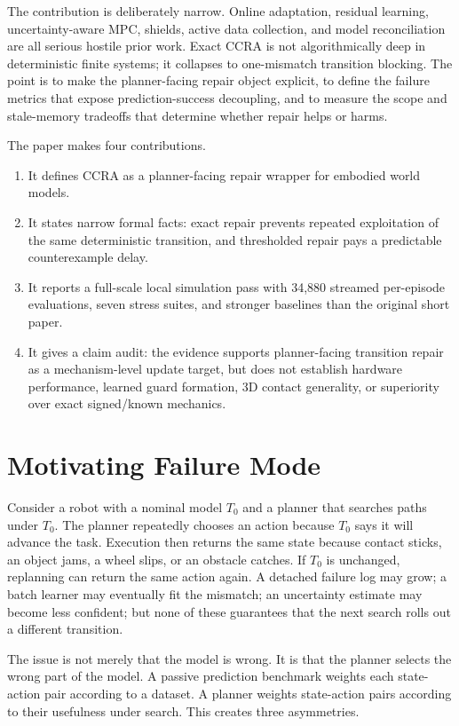 \documentclass{article}
\begin{document}
The contribution is deliberately narrow. Online adaptation, residual learning, uncertainty-aware MPC, shields, active data collection, and model reconciliation are all serious hostile prior work. Exact CCRA is not algorithmically deep in deterministic finite systems; it collapses to one-mismatch transition blocking. The point is to make the planner-facing repair object explicit, to define the failure metrics that expose prediction-success decoupling, and to measure the scope and stale-memory tradeoffs that determine whether repair helps or harms.

The paper makes four contributions.
\begin{enumerate}
    \item It defines CCRA as a planner-facing repair wrapper for embodied world models.
    \item It states narrow formal facts: exact repair prevents repeated exploitation of the same deterministic transition, and thresholded repair pays a predictable counterexample delay.
    \item It reports a full-scale local simulation pass with 34,880 streamed per-episode evaluations, seven stress suites, and stronger baselines than the original short paper.
    \item It gives a claim audit: the evidence supports planner-facing transition repair as a mechanism-level update target, but does not establish hardware performance, learned guard formation, 3D contact generality, or superiority over exact signed/known mechanics.
\end{enumerate}

\section{Motivating Failure Mode}

Consider a robot with a nominal model $T_0$ and a planner that searches paths under $T_0$. The planner repeatedly chooses an action because $T_0$ says it will advance the task. Execution then returns the same state because contact sticks, an object jams, a wheel slips, or an obstacle catches. If $T_0$ is unchanged, replanning can return the same action again. A detached failure log may grow; a batch learner may eventually fit the mismatch; an uncertainty estimate may become less confident; but none of these guarantees that the next search rolls out a different transition.

The issue is not merely that the model is wrong. It is that the planner selects the wrong part of the model. A passive prediction benchmark weights each state-action pair according to a dataset. A planner weights state-action pairs according to their usefulness under search. This creates three asymmetries.
\end{document}
